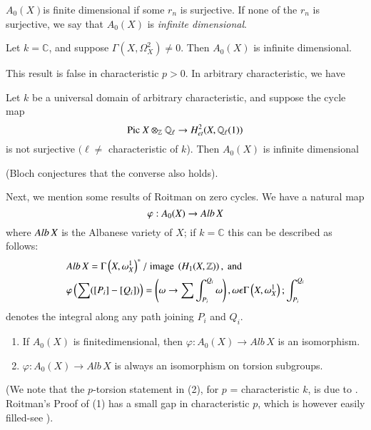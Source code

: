\begin{dfn}
$A_0(X)$\pageoriginale is finite dimensional if some $r_n$ is surjective. If none of the $r_n$ is surjective, we say that $A_0(X)$ is \textit{infinite dimensional}. 
\end{dfn}

\begin{thm}
Let $k=\mathbb{C}$, and suppose $\Gamma\left(X,\Omega^{2}_X\right)\neq 0$. Then $A_0(X)$ is infinite dimensional. 
\end{thm}

This result is false in characteristic $p>0$. In arbitrary characteristic, we have 

\begin{thm}
Let $k$ be a universal domain of arbitrary characteristic, and suppose the cycle map 
$$
\mathrm{Pic}\ X \otimes_{\mathbb{Z}}\mathbb{Q}_{\ell}\to H^{2}_{et}(X, \mathbb{Q}_{\ell}(1))
$$
is not surjective $(\ell\neq$ characteristic of $k$). Then $A_0(X)$ is infinite dimensional 
\end{thm}

(Bloch conjectures that the converse also holds). 

Next, we mention some results of Roitman on zero cycles. We have a natural map 
$$
\varphi:A_0(X)\to Alb\, X 
$$
where $Alb\, X$ is the Albanese variety of $X$; if $k=\mathbb{C}$ this can be described as follows: 
$$
\begin{aligned}
&Alb\, X=\Gamma \left(X, \omega^{1}_X\right)^{\ast}/\text{ image } \left(H_1(X, \mathbb{Z})\right), \text{ and }\\
&{}\varphi\left(\sum([P_i]-[Q_i])\right)=\left(\omega \to \sum \int^{Q_i}_{P_i}\omega\right), \omega \epsilon \Gamma\left(X, \omega^{1}_X\right); \int^{Q_i}_{P_i}
\end{aligned}
$$
\pageoriginale
denotes the integral along any path joining $P_i$ and $Q_i$. 

\begin{thm}
\begin{enumerate}
\renewcommand{\labelenumi}{(\theenumi)}
\item If $A_0(X)$ is finite\break dimensional, then $\varphi:A_0(X)\to Alb\, X$ is an isomorphism.
\item $\varphi:A_0(X)\to Alb\, X$ is always an isomorphism on torsion subgroups.
\end{enumerate}
\end{thm}

(We note that the $p$-torsion statement in (2), for $p$ = characteristic $k$, is due to \cite{Milne}. Roitman's Proof of (1) has a small gap in characteristic $p$, which is however easily filled-see \cite{Srinivasb}). 

